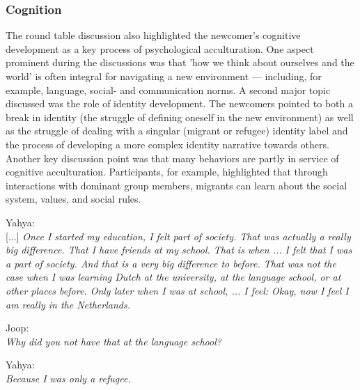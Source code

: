 \documentclass[man, 12pt, a4paper]{apa7}
\begin{document}
\subsubsection{Cognition}
The round table discussion also highlighted the newcomer’s cognitive development as a key process of psychological acculturation. One aspect prominent during the discussions was that 'how we think about ourselves and the world' is often integral for navigating a new environment --- including, for example, language, social- and communication norms. A second major topic discussed was the role of identity development. The newcomers pointed to both a break in identity (the struggle of defining oneself in the new environment) as well as the struggle of dealing with a singular (migrant or refugee) identity label and the process of developing a more complex identity narrative towards others. Another key discussion point was that many behaviors are partly in service of cognitive acculturation. Participants, for example, highlighted that through interactions with dominant group members, migrants can learn about the social system, values, and social rules.
\begin{displayquote}
    Yahya:\\
    {[...]} \textit{Once I started my education, I felt part of society. That was actually a really big difference. That I have friends at my school. That is when ... I felt that I was a part of society. And that is a very big difference to before. That was not the case when I was learning Dutch at the university, at the language school, or at other places before. Only later when I was at school, ... I feel: Okay, now I feel I am really in the Netherlands.}
    
    Joop:\\
    \textit{Why did you not have that at the language school?}
    
    Yahya:\\
    \textit{Because I was only a refugee.}
\end{displayquote}
\end{document}
